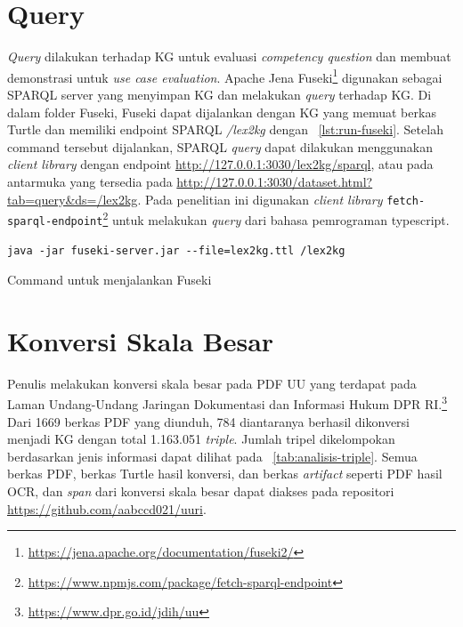 \section{Query}
\label{sec:query}

\textit{Query} dilakukan terhadap KG untuk evaluasi \textit{competency question} dan membuat
demonstrasi untuk \textit{use case evaluation}. Apache Jena
Fuseki\footnote{\url{https://jena.apache.org/documentation/fuseki2/}} digunakan sebagai SPARQL
server yang menyimpan KG dan melakukan \textit{query} terhadap KG. Di dalam folder Fuseki, Fuseki
dapat dijalankan dengan KG yang memuat berkas Turtle  dan memiliki endpoint SPARQL
\textit{/lex2kg} dengan \lst~\ref{lst:run-fuseki}. Setelah command tersebut dijalankan, SPARQL
\textit{query} dapat dilakukan menggunakan \textit{client library} dengan endpoint
\url{http://127.0.0.1:3030/lex2kg/sparql}, atau pada antarmuka yang tersedia pada
\url{http://127.0.0.1:3030/dataset.html?tab=query&ds=/lex2kg}. Pada penelitian ini digunakan
\textit{client library}
\texttt{fetch-sparql-endpoint}\footnote{\url{https://www.npmjs.com/package/fetch-sparql-endpoint}}
untuk melakukan \textit{query} dari bahasa pemrograman typescript.


\begin{listing}[H]
  \begin{verbatim}
java -jar fuseki-server.jar --file=lex2kg.ttl /lex2kg
  \end{verbatim}
  \caption{Command untuk menjalankan Fuseki}
  \label{lst:run-fuseki}
\end{listing}

\section{Konversi Skala Besar}
\label{sec:konversi-skala-besar}

Penulis melakukan konversi skala besar pada PDF UU yang terdapat pada Laman Undang-Undang Jaringan
Dokumentasi dan Informasi Hukum DPR RI.\footnote{\url{https://www.dpr.go.id/jdih/uu}} Dari 1669
berkas PDF yang diunduh, 784 diantaranya berhasil dikonversi menjadi KG dengan total 1.163.051
\textit{triple}. Jumlah tripel dikelompokan berdasarkan jenis informasi dapat dilihat pada
\tab~\ref{tab:analisis-triple}. Semua berkas PDF, berkas Turtle hasil konversi, dan berkas
\textit{artifact} seperti PDF hasil OCR, dan \textit{span} dari konversi skala besar dapat diakses
pada repositori \url{https://github.com/aabccd021/uuri}.

